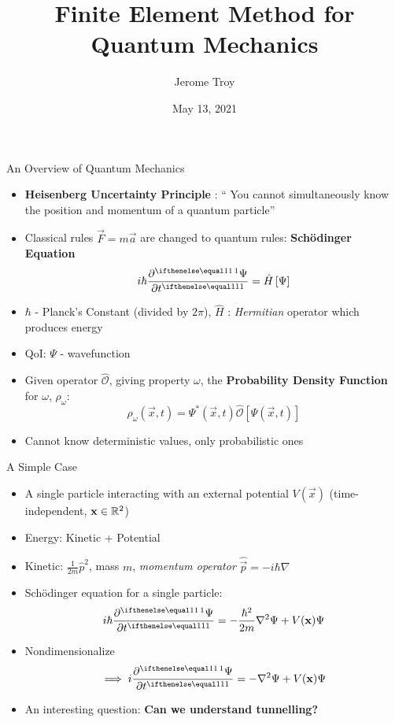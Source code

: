 \documentclass{beamer}
\title[FEM for Quantum]{
		Finite Element Method for Quantum Mechanics
}
\author[J. Troy]{Jerome Troy}
\date{May 13, 2021}
\begin{document}
\begin{frame}
		\titlepage
\end{frame}

\begin{frame}{An Overview of Quantum Mechanics}
  \begin{itemize}
  	\item \textbf{Heisenberg Uncertainty Principle} : ``
			You cannot simultaneously know the position and 
			momentum of a quantum particle''
	\item Classical rules $\vec F = m \vec a$ are changed to
			quantum rules: \textbf{Sch\"odinger Equation}
			\[
					i \hbar \pder{\Psi}{t} = \hat H\left[\Psi\right]
			\] 
	\item $\hbar$ - Planck's Constant (divided by $2\pi$), 
			$\hat H$ : \textit{Hermitian} operator which produces energy
	\item QoI: $\Psi$ - wavefunction
	\item Given operator $\hat{\mathcal O}$, giving property $\omega$, 
			the \textbf{Probability Density Function} for $\omega$,
			$\rho_\omega$:
			\[
					\rho_\omega(\vec x, t) = \Psi^*(\vec x, t) 
					\hat{\mathcal O}\left[\Psi(\vec x, t)\right]
			\] 
	\item Cannot know deterministic values, only probabilistic ones
  \end{itemize}
\end{frame}

\begin{frame}{A Simple Case}
  \begin{itemize}
  	\item A single particle interacting with an external potential 
			$V(\vec x)$ (time-independent, $\mathbf{x} \in \mathbb{R}^2$)
	\item Energy: Kinetic + Potential
	\item Kinetic: $\frac{1}{2m} \hat p^2$, mass $m$, 
			\textit{momentum operator} $\hat{\vec p} = -i \hbar \nabla$
	\item Sch\"odinger equation for a single particle:
			\[
					i \hbar \pder{\Psi}{t} = 
					-\frac{\hbar^2}{2m} \nabla^2 \Psi + V(\vec x) \Psi
			\]
	\item Nondimensionalize 
			\[
					\implies i \pder{\Psi}{t} = 
					-\nabla^2 \Psi + V(\vec x) \Psi
			\] 
	\item An interesting question: \textbf{Can we understand tunnelling?}
  \end{itemize}
\end{frame}
\end{document}
